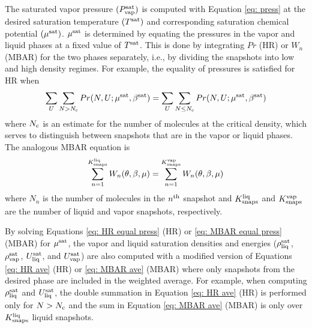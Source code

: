 \documentclass[journal=jced,manuscript=article]{achemso}
\begin{document}
The saturated vapor pressure $(P_{\rm vap}^{\rm sat})$ is computed with Equation \ref{eq: press} at the desired saturation temperature $(T^{\rm sat})$ and corresponding saturation chemical potential $(\mu^{\rm sat})$. $\mu^{\rm sat}$ is determined by equating the pressures in the vapor and liquid phases at a fixed value of $T^{\rm sat}$. This is done by integrating $Pr$ (HR) or $W_{n}$ (MBAR) for the two phases separately, i.e., by dividing the snapshots into low and high density regimes. For example, the equality of pressures is satisfied for HR when
\begin{eqnarray} \label{eq: HR equal press}
\sum_{U} \sum_{N > N_{\rm c}} Pr(N,U;\mu^{\rm sat},\beta^{\rm sat}) = \sum_{U} \sum_{N \leq N_{\rm c}} Pr(N,U;\mu^{\rm sat},\beta^{\rm sat})
\end{eqnarray}
where $N_{\rm c}$ is an estimate for the number of molecules at the critical density, which serves to distinguish between snapshots that are in the vapor or liquid phases. The analogous MBAR equation is
\begin{eqnarray} \label{eq: MBAR equal press}
\sum_{n=1}^{K^{\rm liq}_{\rm snaps}} W_{n}(\theta,\beta,\mu) = \sum_{n=1}^{K^{\rm vap}_{\rm snaps}} W_{n}(\theta,\beta,\mu)
\end{eqnarray}
where $N_n$ is the number of molecules in the $n^{\rm th}$ snapshot and $K^{\rm liq}_{\rm snaps}$ and $K^{\rm vap}_{\rm snaps}$ are the number of liquid and vapor snapshots, respectively.

By solving Equations \ref{eq: HR equal press} (HR) or \ref{eq: MBAR equal press} (MBAR) for $\mu^{\rm sat}$, the vapor and liquid saturation densities and energies ($\rho_{\rm liq}^{\rm sat}$, $\rho_{\rm vap}^{\rm sat}$, $U_{\rm liq}^{\rm sat}$, and $U_{\rm vap}^{\rm sat}$) are also computed with a modified version of Equations \ref{eq: HR ave} (HR) or \ref{eq: MBAR ave} (MBAR) where only snapshots from the desired phase are included in the weighted average. For example, when computing $\rho_{\rm liq}^{\rm sat}$ and $U_{\rm liq}^{\rm sat}$, the double summation in Equation \ref{eq: HR ave} (HR) is performed only for $N > N_{\rm c}$ and the sum in Equation \ref{eq: MBAR ave} (MBAR) is only over $K^{\rm liq}_{\rm snaps}$ liquid snapshots.
\end{document}
